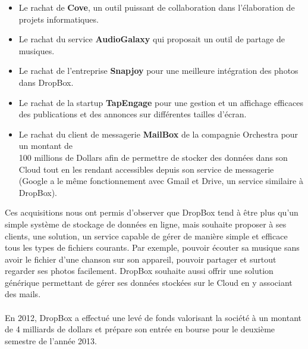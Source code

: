 \documentclass[a4paper, 10pt]{article}
\begin{document}
\begin{itemize}
 \item Le rachat de \textbf{Cove}, un outil puissant de collaboration dans l'\'elaboration de projets informatiques.
 \item Le rachat du service \textbf{AudioGalaxy} qui proposait un outil de partage de musiques.
 \item Le rachat de l'entreprise \textbf{Snapjoy} pour une meilleure int\'egration des photos dans DropBox.
 \item Le rachat de la startup \textbf{TapEngage} pour une gestion et un affichage efficaces des publications et des annonces
sur diff\'erentes tailles d'\'ecran.
 \item Le rachat du client de messagerie \textbf{MailBox} de la compagnie Orchestra pour un montant de\\100 millions de Dollars
afin de permettre de stocker des donn\'ees dans son Cloud tout en les rendant accessibles depuis son service de messagerie
(Google a le m\^eme fonctionnement avec Gmail et Drive, un service similaire \`a DropBox).
\end{itemize}
Ces acquisitions nous ont permis d'observer que DropBox tend \`a \^etre plus qu'un simple syst\`eme de stockage de donn\'ees en ligne,
mais souhaite proposer \`a ses clients, une solution, un service capable de g\'erer de mani\`ere simple et efficace
tous les types de fichiers courants.
Par exemple, pouvoir \'ecouter sa musique sans avoir le fichier d'une chanson sur son appareil,
pouvoir partager et surtout regarder ses photos facilement.
DropBox souhaite aussi offrir une solution g\'en\'erique permettant de g\'erer ses donn\'ees stock\'ees sur le Cloud en y associant des mails.\\ \\
En 2012, DropBox a effectu\'e une lev\'e de fonds valorisant la soci\'et\'e \`a un montant de 4 milliards de dollars et
pr\'epare son entr\'ee en bourse pour le deuxi\`eme semestre de l'ann\'ee 2013.\\ \\
\end{document}

